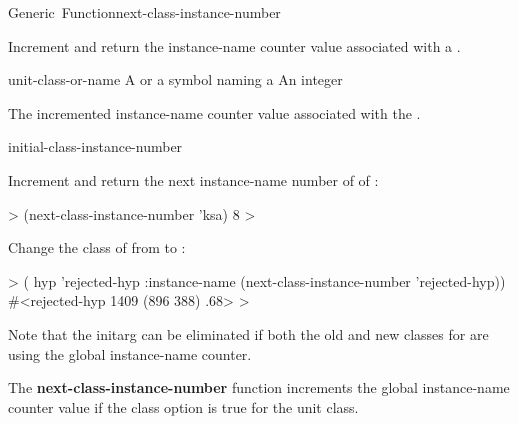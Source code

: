 \documentclass[10pt,twoside,english,pdftex]{article}
\begin{document}
\begin{functiondoc}{Generic~Function}{next-class-instance-number}%
  { 
    \returns{} }
%
%

\fnsyntax

\fnpurpose Increment and return the instance-name counter value
associated with a .

\fnmethods
{}%
  {\code{(} 
  \returns{} } 
%
  {\code{(} 
  \returns{} }

\fnpackage {}

\fnmodule {}

\fnargs
\begin{args}{unit-class-or-name}
 A  or a symbol naming a
\arg[integer] An integer
\end{args}

\fnreturns The incremented instance-name counter value
associated with the .

\begin{alsos}{initial-class-instance-number}
\end{alsos}

\fnexamples
%
Increment and return the next instance-name number of 
of :
%
\W\supp
\begin{example}
  > (next-class-instance-number 'ksa)
  8
  >
\end{example} 

%
%
Change the class of   from
 to :
%
\W\supp
\begin{example}
  > ( hyp 'rejected-hyp 
      :instance-name (next-class-instance-number 'rejected-hyp))
  #<rejected-hyp 1409 (896 388) .68>
  >
\end{example}
%
Note that the  initarg can be eliminated if both the old
and new classes for  are using the global instance-name counter.

\fnnote
%
%
The \textbf{next-class-instance-number} function increments the global
instance-name counter value if the 
class option is true for the unit class.

\end{functiondoc}
\end{document}

